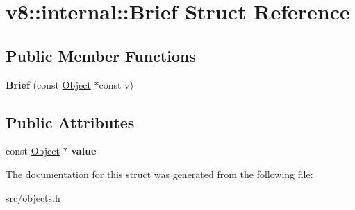 \hypertarget{structv8_1_1internal_1_1_brief}{}\section{v8\+:\+:internal\+:\+:Brief Struct Reference}
\label{structv8_1_1internal_1_1_brief}
\subsection*{Public Member Functions}
\begin{DoxyCompactItemize}
\item 
\hypertarget{structv8_1_1internal_1_1_brief_ad8c36e6895604d507dff45fbc0e48b6d}{}{\bfseries Brief} (const \hyperlink{classv8_1_1internal_1_1_object}{Object} $\ast$const v)\label{structv8_1_1internal_1_1_brief_ad8c36e6895604d507dff45fbc0e48b6d}

\end{DoxyCompactItemize}
\subsection*{Public Attributes}
\begin{DoxyCompactItemize}
\item 
\hypertarget{structv8_1_1internal_1_1_brief_aa8fb3f951c2e4f16023e5bf8d4addc91}{}const \hyperlink{classv8_1_1internal_1_1_object}{Object} $\ast$ {\bfseries value}\label{structv8_1_1internal_1_1_brief_aa8fb3f951c2e4f16023e5bf8d4addc91}

\end{DoxyCompactItemize}


The documentation for this struct was generated from the following file\+:\begin{DoxyCompactItemize}
\item 
src/objects.\+h\end{DoxyCompactItemize}
